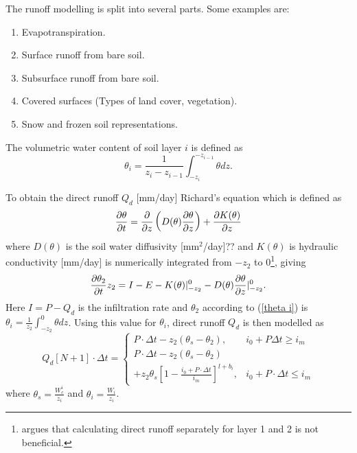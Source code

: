 The runoff modelling is split into several parts. Some examples are:
\begin{enumerate}
    \item Evapotranspiration.
	\item Surface runoff from bare soil.
	\item Subsurface runoff from bare soil.
	\item Covered surfaces (Types of land cover, vegetation).
	\item Snow and frozen soil representations.
\end{enumerate}
The volumetric water content of soil layer $i$ is defined as 
\begin{equation}
    \theta_i = \frac{1}{z_i - z_{i-1}} \int_{-z_i}^{-z_{i-1}} \theta dz. \label{theta i}
\end{equation}

To obtain the direct runoff $Q_d$ [mm/day] Richard's equation which is defined as 
\begin{equation}
    \pdv{\theta}{t} = \pdv{}{z}\left( D(\theta)\pdv{\theta}{z}  \right) + \pdv{K(\theta)}{z}
    \label{richard}
\end{equation}
where $D(\theta)$ is the soil water diffusivity [mm$^2$/day]{\Large ??} and $K(\theta)$ is hydraulic
conductivity [mm/day]
is numerically integrated from $-z_{2}$ to $0$\footnote{\cite{VIC2L} argues that 
calculating direct runoff separately for layer 1 and 2 is not beneficial.}, giving \cite{VIC2L}
\begin{equation}
    \pdv{\theta_2}{t}z_2 = I - E - K(\theta) |_{-z_2}^0 - D(\theta) \pdv{\theta}{z} |_{-z_2}^0.
    \label{richards numerical}
\end{equation}
Here $I = P - Q_d$ is the infiltration rate and $\theta_2$ according to (\ref{theta i}) 
is $\theta_i = \frac{1}{z_2}\int_{-z_2}^0 \theta dz$.
Using this value for $\theta_i$, direct runoff $Q_d$ is then modelled as \cite{VIC2L}
\begin{equation}
Q_d\left[ N+1 \right] \cdot \Delta t = 
\begin{cases}
    P \cdot \Delta t - z_2 (\theta_s - \theta_2), &  i_0 + P \Delta t \geq i_m\\
    P \cdot \Delta t - z_2 (\theta_s - \theta_2) \\ + z_2 \theta_s \left[  1 - 
    \frac{i_0 + P \cdot \Delta t}{i_m} \right]^{l+b_i}, & i_0 + P \cdot \Delta t \leq i_m
\end{cases} \label{VIC direct runoff}
\end{equation}
where $\theta_s=\frac{W_c^i}{z_i}$ and $\theta_i = \frac{W_i}{z_i}$.

